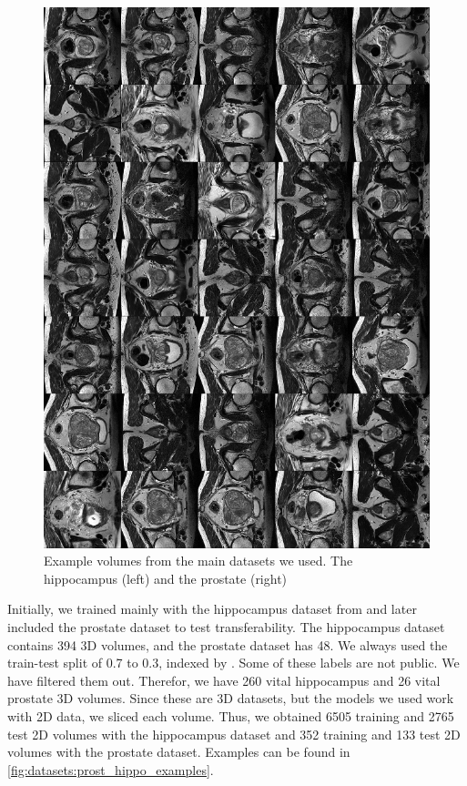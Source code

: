 \begin{figure}[h]
\begin{minipage}{0.49\textwidth}
        \includegraphics[width=\linewidth]{Graphics/datasets/dataset_prost_examples_small_highRes.png}
    \end{minipage}
    \caption{Example volumes from the main datasets we used. The hippocampus (left) and the prostate (right)}
    \label{fig:datasets:prost_hippo_examples}
\end{figure}

Initially, we trained mainly with the hippocampus dataset from \cite{Antonelli:2022:MedSegmentationDecatlon} and later included the prostate dataset to test transferability. The hippocampus dataset contains 394 3D volumes, and the prostate dataset has 48. We always used the train-test split of 0.7 to 0.3, indexed by \cite{Antonelli:2022:MedSegmentationDecatlon}. Some of these labels are not public. We have filtered them out. Therefor, we have 260 vital hippocampus and 26 vital prostate 3D volumes. Since these are 3D datasets, but the models we used work with 2D data, we sliced each volume. Thus, we obtained 6505 training and 2765 test 2D volumes with the hippocampus dataset and 352 training and 133 test 2D volumes with the prostate dataset. Examples can be found in \autoref{fig:datasets:prost_hippo_examples}.

